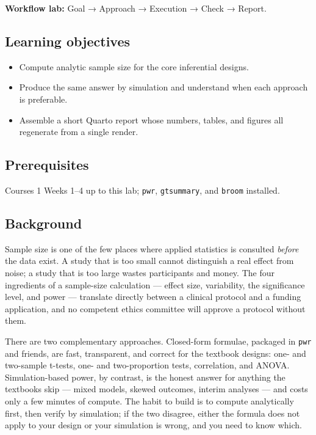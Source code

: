 \documentclass[
]{article}
\author{}
\date{\vspace{-2.5em}}
\providecommand{\tightlist}{%
  \setlength{\itemsep}{0pt}\setlength{\parskip}{0pt}}
\begin{document}
\textbf{Workflow lab:} Goal → Approach → Execution → Check → Report.

\subsection{Learning objectives}\label{learning-objectives}

\begin{itemize}
\tightlist
\item
  Compute analytic sample size for the core inferential designs.
\item
  Produce the same answer by simulation and understand when each
  approach is preferable.
\item
  Assemble a short Quarto report whose numbers, tables, and figures all
  regenerate from a single render.
\end{itemize}

\subsection{Prerequisites}\label{prerequisites}

Courses 1 Weeks 1--4 up to this lab; \texttt{pwr}, \texttt{gtsummary},
and \texttt{broom} installed.

\subsection{Background}\label{background}

Sample size is one of the few places where applied statistics is
consulted \emph{before} the data exist. A study that is too small cannot
distinguish a real effect from noise; a study that is too large wastes
participants and money. The four ingredients of a sample-size
calculation --- effect size, variability, the significance level, and
power --- translate directly between a clinical protocol and a funding
application, and no competent ethics committee will approve a protocol
without them.

There are two complementary approaches. Closed-form formulae, packaged
in \texttt{pwr} and friends, are fast, transparent, and correct for the
textbook designs: one- and two-sample t-tests, one- and two-proportion
tests, correlation, and ANOVA. Simulation-based power, by contrast, is
the honest answer for anything the textbooks skip --- mixed models,
skewed outcomes, interim analyses --- and costs only a few minutes of
compute. The habit to build is to compute analytically first, then
verify by simulation; if the two disagree, either the formula does not
apply to your design or your simulation is wrong, and you need to know
which.
\end{document}

